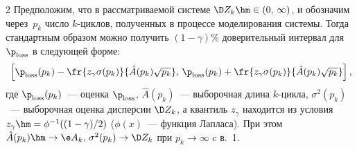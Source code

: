 \begin{multicols}{2}
Предположим, что в рассматриваемой сис\-те\-ме $\D Z_k\hm\in(0,\,\infty)$, и обозначим
через~$p_k$ чис\-ло  $k$-цик\-лов, полученных в процессе моделирования сис\-те\-мы.
Тогда стандартным образом можно получить $(1-\gamma)\%$ доверительный интервал
для $\p_{\mathrm{loss}}$ в следующей форме: 
\begin{equation}
\hspace*{-1pt}\left[\p_{\mathrm{loss}}(p_k)-\fr{z_{\gamma}\sigma(p_k)}{\hat{A}(p_k)\sqrt{p_k}},
\,\p_{\mathrm{loss}}(p_k)+\fr{z_{\gamma}\sigma(p_k)}{\hat{A}(p_k)\sqrt{p_k}}\right],\!\!
\label{e9-mn}
\end{equation}
 где $\p_{\mathrm{loss}}(p_k)$~--- оценка $\p_{\mathrm{loss}}$, $\hat{A}(p_k)$~---
выборочная длина $k$-цик\-ла, $\sigma^2(p_k)$~--- выборочная оценка дисперсии
$\D Z_k$, а квантиль $z_{\gamma}$ находится из условия $z_{\gamma}\hm=\phi ^{-1}((1-\gamma)/2)$ 
($\phi(x)$~--- функция Лапласа). При этом $\hat{A}(p_k)\hm\to \e A_k,\,\sigma^2(p_k)\to \D Z_k$ 
при $p_k\to \infty$ c в.~1.


\end{multicols}
